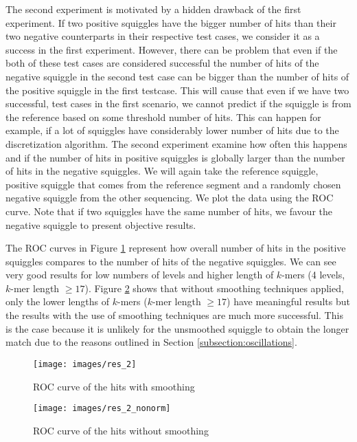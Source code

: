 The second experiment is motivated by a hidden drawback of the first experiment.
If two positive squiggles have
the bigger number of hits than their two negative counterparts in their respective test cases,
we consider it as a success in the first experiment. However, there can be problem
that even if the both of these test cases are considered successful
the number of hits of the negative squiggle in the second test case can be bigger than
the number of hits of the positive squiggle in the first testcase. This will cause that
even if we have two successful, test cases in the first scenario, we cannot predict
if the squiggle is from the reference based on some threshold number of hits. This
can happen for example, if a lot of squiggles have considerably lower number of hits
due to the discretization algorithm.
The second experiment examine how often this happens and if the number of hits in
positive squiggles is globally larger than the number of hits in the negative squiggles.
We will again take the reference squiggle, positive squiggle that comes from the
reference segment and a randomly chosen negative squiggle from the other sequencing.
We plot the data using the ROC curve. Note that if two squiggles have the same number
of hits, we favour the negative squiggle to present objective results.

The ROC curves in Figure \ref{obr:res_2} represent how overall number
of hits in the positive squiggles compares to the number of hits of the negative
squiggles. We can see very good results for low numbers of levels and higher
length of $k$-mers (4 levels, $k$-mer length $\geq 17$). Figure \ref{obr:res_2_nonorm} shows that without smoothing
techniques applied, only the lower lengths of $k$-mers ($k$-mer length $\geq 17$) have meaningful results
but the results with the use of smoothing techniques are much more successful. This is
the case because it is unlikely for the unsmoothed squiggle to obtain the longer
match due to the reasons outlined in Section \ref{subsection:oscillations}.

\begin{figure}
\centerline{\texttt{[image: images/res\_2]}}
\caption[TODO]{ROC curve of the hits with smoothing}
\label{obr:res_2}
\end{figure}

\begin{figure}
\centerline{\texttt{[image: images/res\_2\_nonorm]}}
\caption[TODO]{ROC curve of the hits without smoothing}
\label{obr:res_2_nonorm}
\end{figure}

